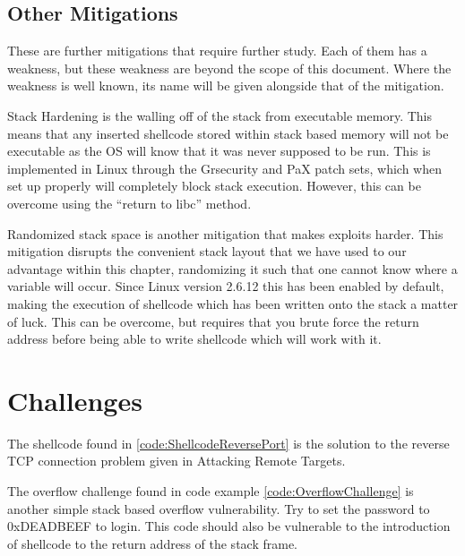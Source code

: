 \documentclass[a4paper,11pt]{report}
\begin{document}
		\subsection{Other Mitigations}
			These are further mitigations that require further study. 
			Each of them has a weakness, but these weakness are beyond the scope of this document. 
			Where the weakness is well known, its name will be given alongside that of the mitigation. 

			Stack Hardening is the walling off of the stack from executable memory. 
			This means that any inserted shellcode stored within stack based memory will not be executable as the OS will know that it was never supposed to be run. 
			This is implemented in Linux through the Grsecurity and PaX patch sets, which when set up properly will completely block stack execution. 
			However, this can be overcome using the ``return to libc'' method.

			Randomized stack space is another mitigation that makes exploits harder. 
			This mitigation disrupts the convenient stack layout that we have used to our advantage within this chapter, randomizing it such that one cannot know where a variable will occur. 
			Since Linux version 2.6.12 this has been enabled by default, making the execution of shellcode which has been written onto the stack a matter of luck. 
			This can be overcome, but requires that you brute force the return address before being able to write shellcode which will work with it. 


	\section{Challenges}
		The shellcode found in \ref{code:ShellcodeReversePort} is the solution to the reverse TCP connection problem given in Attacking Remote Targets. 
		\begin{code}
			Assembler}]{./ShellcodeReversePort.asm}
			\caption{Reverse socket connection shellcode challenge}
			\label{code:ShellcodeReversePort}
		\end{code}
		\newpage
		The overflow challenge found in code example \ref{code:OverflowChallenge} is another simple stack based overflow vulnerability. 
		Try to set the password to 0xDEADBEEF to login.
		This code should also be vulnerable to the introduction of shellcode to the return address of the stack frame. 
		\begin{code}
			C}]{./OverflowChallenge.c}
			\caption{Overflow Challenge}
			\label{code:OverflowChallenge}
		\end{code}
\end{document}
